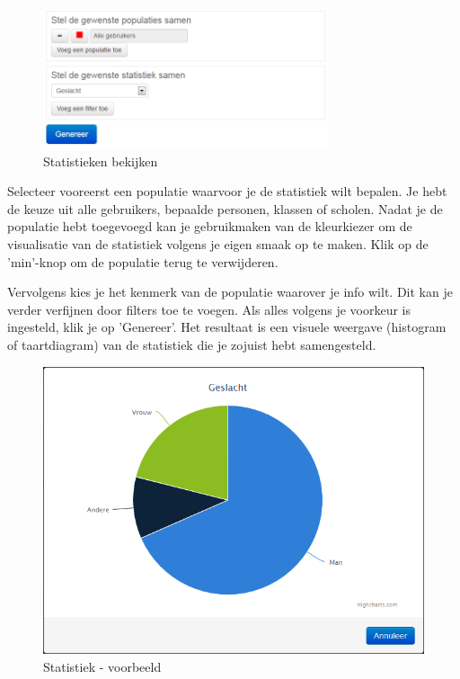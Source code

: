 \documentclass[]{article}
\begin{document}
\begin{figure}[!ht]
	\centering
	\includegraphics[width=0.75\textwidth]{img/stats}
	\caption{Statistieken bekijken}
	\label{stats}
\end{figure}

Selecteer vooreerst een populatie waarvoor je de statistiek wilt bepalen. Je hebt de keuze uit alle gebruikers, bepaalde personen, klassen of scholen. Nadat je de populatie hebt toegevoegd kan je gebruikmaken van de kleurkiezer om de visualisatie van de statistiek volgens je eigen smaak op te maken. Klik op de 'min'-knop om de populatie terug te verwijderen.

Vervolgens kies je het kenmerk van de populatie waarover je info wilt. Dit kan je verder verfijnen door filters toe te voegen. Als alles volgens je voorkeur is ingesteld, klik je op 'Genereer'. Het resultaat is een visuele weergave (histogram of taartdiagram) van de statistiek die je zojuist hebt samengesteld.

\begin{figure}[!ht]
	\centering
	\includegraphics[width=1\textwidth]{img/chart}
	\caption{Statistiek - voorbeeld}
	\label{chart}
\end{figure}
\end{document}
